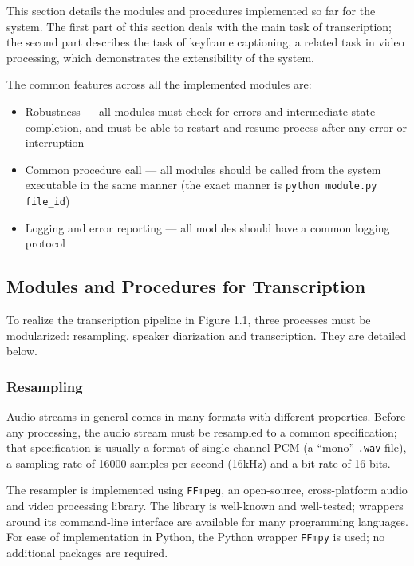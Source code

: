 This section details the modules and procedures implemented so far for the system. The first part of this section deals with the main task of transcription; the second part describes the task of keyframe captioning, a related task in video processing, which demonstrates the extensibility of the system.

The common features across all the implemented modules are:

\begin{itemize}
    \item Robustness --- all modules must check for errors and intermediate state completion, and must be able to restart and resume process after any error or interruption
    \item Common procedure call --- all modules should be called from the system executable in the same manner (the exact manner is \texttt{python module.py file\_id})
    \item Logging and error reporting --- all modules should have a common logging protocol
\end{itemize}

\subsection{Modules and Procedures for Transcription}

To realize the transcription pipeline in Figure 1.1, three processes must be modularized: resampling, speaker diarization and transcription. They are detailed below.

\subsubsection{Resampling}

Audio streams in general comes in many formats with different properties. Before any processing, the audio stream must be resampled to a common specification; that specification is usually a format of single-channel PCM (a ``mono'' \texttt{.wav} file), a sampling rate of 16000 samples per second (16kHz) and a bit rate of 16 bits.

The resampler is implemented using \texttt{FFmpeg}, an open-source, cross-platform audio and video processing library. The library is well-known and well-tested; wrappers around its command-line interface are available for many programming languages. For ease of implementation in Python, the Python wrapper \texttt{FFmpy} is used; no additional packages are required.

